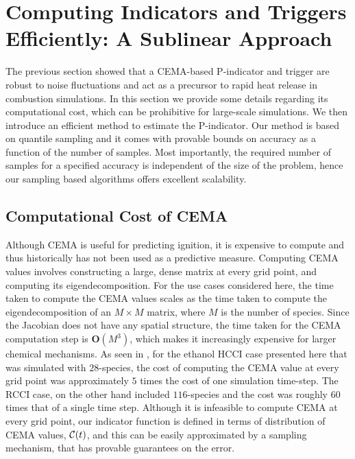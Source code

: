 \documentclass[final]{siamltex}
\newcommand{\cC}{{\cal C}}
\newcommand{\cema}{\cC}
\newcommand{\pmetric}{P}
\begin{document}
\section{Computing Indicators and Triggers Efficiently: A Sublinear Approach}
\label{sec:sample} 
The previous section showed that a CEMA-based \pmetric-indicator and
trigger are robust to noise fluctuations and act as a precursor to rapid heat
release in combustion simulations. In this section we provide some details
regarding its computational cost, which can be prohibitive for large-scale
simulations.  We then introduce an efficient method  to estimate the
\pmetric-indicator. Our method is based on quantile sampling and it comes with
provable bounds on accuracy as a function of the number of samples.  Most
importantly,  the required number of samples for a specified accuracy is
independent of  the size of the problem, hence our sampling based algorithms
offers  excellent scalability. 

\subsection{Computational Cost of CEMA}
Although CEMA is useful for predicting ignition, it is expensive to
compute and thus historically has not been used as a predictive measure. 
Computing CEMA values involves constructing  a large, dense matrix at every grid
point, and computing its eigendecomposition. For the use cases considered here, the time taken to compute the
CEMA values scales as the time taken to compute the eigendecomposition of an $M\times M$ matrix,
where $M$ is the number of species.
Since the Jacobian does not have any spatial structure, the time taken for the CEMA computation step is
$\textbf{O}(M^3)$, which makes it increasingly expensive for larger chemical mechanisms. As seen in 
, for the ethanol
HCCI case presented here that was simulated with $28$-species, the cost of computing the CEMA value
at every grid point was approximately $5$ times the cost of one simulation time-step. The RCCI case, 
on the other hand included $116$-species and the cost was roughly $60$ times that of a single time step.
Although it is infeasible to compute CEMA at every grid point,  our indicator
function is defined in 
terms of distribution of  CEMA values, $\cema(t)$, and this can be easily approximated by a sampling mechanism, that has provable 
guarantees on the error. 
\end{document}
